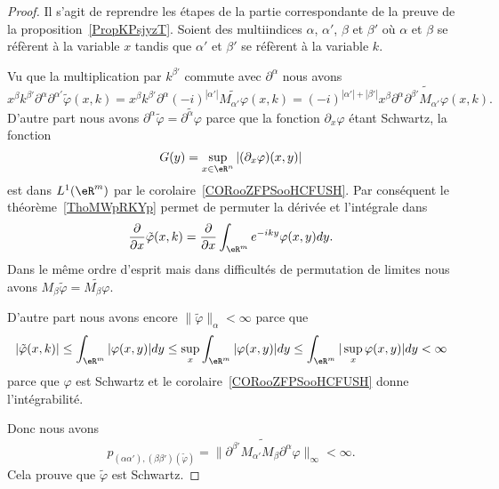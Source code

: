 \begin{proof}
    Il s'agit de reprendre les étapes de la partie correspondante de la preuve de la proposition~\ref{PropKPsjyzT}. Soient des multiindices \( \alpha\), \( \alpha'\), \( \beta\) et \( \beta'\) où \( \alpha\) et \( \beta\) se réfèrent à la variable \( x\) tandis que \( \alpha'\) et \( \beta'\) se réfèrent à la variable \( k\).

    Vu que la multiplication par \( k^{\beta'}\) commute avec \( \partial^{\alpha}\) nous avons
    \begin{equation}
        x^{\beta}k^{\beta'}\partial^{\alpha}\partial^{\alpha'}\tilde \varphi(x,k)=x^{\beta}k^{\beta'}\partial^{\alpha}(-i)^{| \alpha' |}\widetilde{M_{\alpha'}\varphi}(x,k)=(-i)^{| \alpha' |+| \beta' |}x^{\beta}\partial^{\alpha}\widetilde{    \partial^{\beta'}M_{\alpha'}\varphi  }(x,k).
    \end{equation}
    D'autre part nous avons \( \partial^{\alpha}\tilde \varphi=\widetilde{\partial^{\alpha}\varphi}\) parce que la fonction \( \partial_x\varphi\) étant Schwartz, la fonction
    \begin{equation}
        G(y)=\sup_{x\in \eR^n}|(\partial_x\varphi)(x,y)|
    \end{equation}
    est dans \( L^1(\eR^m)\) par le corolaire~\ref{CORooZFPSooHCFUSH}. Par conséquent le théorème~\ref{ThoMWpRKYp} permet de permuter la dérivée et l'intégrale dans
    \begin{equation}
        \frac{ \partial  }{ \partial x }\tilde \varphi(x,k)=\frac{ \partial  }{ \partial x }\int_{\eR^m} e^{-iky}\varphi(x,y)dy.
    \end{equation}
    Dans le même ordre d'esprit mais dans difficultés de permutation de limites nous avons \( M_{\beta}\tilde \varphi=\widetilde{M_{\beta}\varphi}\).

    D'autre part nous avons encore \( \| \tilde \varphi \|_{\alpha}<\infty\) parce que
    \begin{equation}
        | \tilde \varphi(x,k) |\leq \int_{\eR^m}| \varphi(x,y) |dy\leq \sup_x\int_{\eR^m}| \varphi(x,y) |dy\leq \int_{\eR^m}| \sup_x\varphi(x,y) |dy<\infty
    \end{equation}
    parce que \( \varphi\) est Schwartz et le corolaire~\ref{CORooZFPSooHCFUSH} donne l'intégrabilité.

    Donc nous avons
    \begin{equation}
        p_{(\alpha\alpha'),(\beta\beta')(\tilde \varphi)}=\|  \widetilde{   \partial^{\beta'}M_{\alpha'}M_{\beta}\partial^{\alpha}\varphi      }    \|_{\infty}<\infty.
    \end{equation}
    Cela prouve que \( \tilde \varphi\) est Schwartz.
\end{proof}

